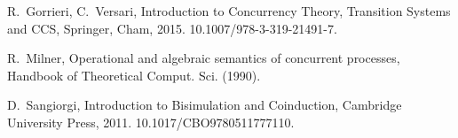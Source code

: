 \documentclass[GCNS]{yincog}
\theoremstyle{remark}
\theoremstyle{theorem}
\theoremstyle{remark}
\begin{document}
\begin{backmatter}
\begin{thebibliography}{}
\begin{bsubitem}
\begin{bcontribution}%
\end{bcontribution}
\begin{bhost}
\begin{bbook}
\end{bbook}
\end{bhost}
\end{bsubitem}
%
\OrigBibText
R.~Gorrieri, C.~Versari, {Introduction to Concurrency Theory}, Transition
Systems and CCS, Springer, Cham, 2015. 10.1007/978-3-319-21491-7.
\endOrigBibText
{}%
\endbibitem

\begin{bsubitem}
\begin{bcontribution}%
\end{bcontribution}
\begin{bhost}
\begin{beditedbook}
\end{beditedbook}
\end{bhost}
\end{bsubitem}
%
\OrigBibText
R.~Milner, Operational and algebraic semantics of concurrent processes,
Handbook of Theoretical Comput. Sci. (1990).
\endOrigBibText
{}%
\endbibitem

\begin{bsubitem}
\begin{bcontribution}%
\end{bcontribution}
\begin{bhost}
\begin{bbook}
\end{bbook}
\end{bhost}
\end{bsubitem}
%
\OrigBibText
D.~Sangiorgi, Introduction to Bisimulation and Coinduction, Cambridge University
Press, 2011. 10.1017/CBO9780511777110.
\endOrigBibText
{}%
\endbibitem


\end{thebibliography}
\end{backmatter}
\end{document}
